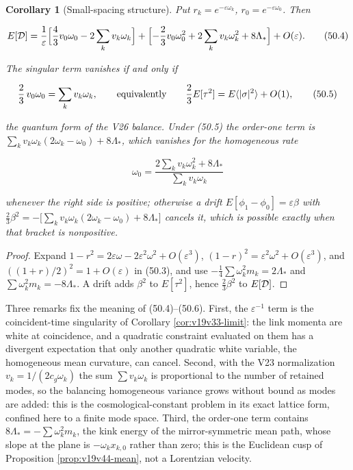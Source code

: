 \documentclass[11pt]{article}
\newtheorem{corollary}[theorem]{Corollary}
\theoremstyle{remark}
\begin{document}
\begin{corollary}[Small-spacing structure]
\label{cor:v19v47-structure}
Put \(r_k=e^{-\varepsilon\omega_k}\), \(r_0=e^{-\varepsilon\omega_0}\).
Then

\[
 E[{\cal D}]
 =\frac1\varepsilon\Bigl[\frac43v_0\omega_0-2\sum_kv_k\omega_k\Bigr]
 +\Bigl[-\frac23v_0\omega_0^2+2\sum_kv_k\omega_k^2+8\Lambda_*\Bigr]
 +O(\varepsilon).                                                       \tag{50.4}
\]

The singular term vanishes if and only if

\[
 \frac23\,v_0\omega_0=\sum_kv_k\omega_k,
 \qquad\hbox{equivalently}\qquad
 \frac23E[\tau^2]=E\langle|\sigma|^2\rangle+O(1),                        \tag{50.5}
\]

the quantum form of the V26 balance.  Under (50.5) the order-one term
is \(\sum_kv_k\omega_k(2\omega_k-\omega_0)+8\Lambda_*\), which vanishes
for the homogeneous rate

\[
 \omega_0=\frac{2\sum_kv_k\omega_k^2+8\Lambda_*}{\sum_kv_k\omega_k}
                                                                    \tag{50.6}
\]

whenever the right side is positive; otherwise a drift
\(E[\phi_1-\phi_0]=\varepsilon\beta\) with
\(\tfrac23\beta^2=-\bigl[\sum_kv_k\omega_k(2\omega_k-\omega_0)+8\Lambda_*\bigr]\)
cancels it, which is possible exactly when that bracket is nonpositive.
\end{corollary}

\begin{proof}
Expand \(1-r^2=2\varepsilon\omega-2\varepsilon^2\omega^2+O(\varepsilon^3)\),
\((1-r)^2=\varepsilon^2\omega^2+O(\varepsilon^3)\), and
\(((1+r)/2)^2=1+O(\varepsilon)\) in (50.3), and use
\(-\tfrac14\sum\omega_k^2m_k=2\Lambda_*\) and
\(\sum\omega_k^2m_k=-8\Lambda_*\).  A drift adds \(\beta^2\) to
\(E[\tau^2]\), hence \(\tfrac23\beta^2\) to \(E[{\cal D}]\).
\end{proof}

Three remarks fix the meaning of (50.4)--(50.6).  First, the
\(\varepsilon^{-1}\) term is the coincident-time singularity of
Corollary \ref{cor:v19v33-limit}: the link momenta are white at
coincidence, and a quadratic constraint evaluated on them has a
divergent expectation that only another quadratic white variable, the
homogeneous mean curvature, can cancel.  Second, with the V23
normalization \(v_k=1/(2c_g\omega_k)\) the sum \(\sum v_k\omega_k\) is
proportional to the number of retained modes, so the balancing
homogeneous variance grows without bound as modes are added: this is
the cosmological-constant problem in its exact lattice form, confined
here to a finite mode space.  Third, the order-one term contains
\(8\Lambda_*=-\sum\omega_k^2m_k\), the kink energy of the mirror-symmetric
mean path, whose slope at the plane is \(-\omega_kx_{k,0}\) rather than
zero; this is the Euclidean cusp of Proposition
\ref{prop:v19v44-mean}, not a Lorentzian velocity.
\end{document}
